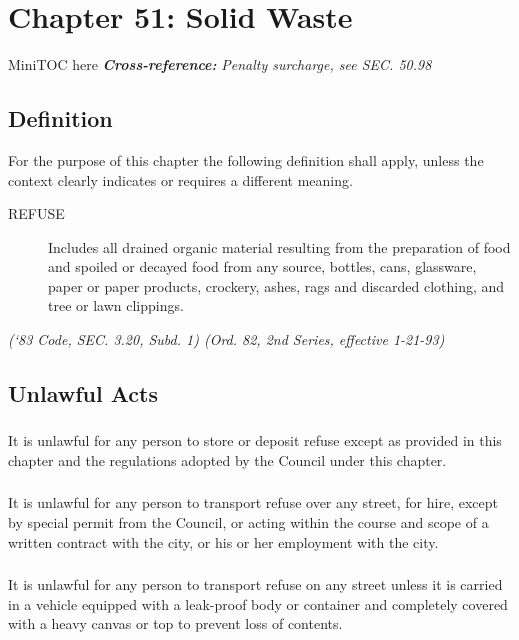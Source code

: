 \documentclass[code.tex]{subfiles}
\begin{document}
\chapter*{Chapter 51: \newline
	Solid Waste}

MiniTOC here\newline
\textbf{\emph{{Cross-reference:}}}\newline
\emph{Penalty surcharge, see SEC. 50.98}
\pagebreak

\section{Definition}
For the purpose of this chapter the following definition shall apply, unless the context clearly indicates or requires a different meaning.
\begin{description}
\item[REFUSE] Includes all drained organic material resulting from the preparation of food and spoiled or decayed food from any source, bottles, cans, glassware, paper or paper products, crockery, ashes, rags and discarded clothing, and tree or lawn clippings.
\end{description}
\emph{(‘83 Code, SEC. 3.20, Subd. 1) (Ord. 82, 2nd Series, effective 1-21-93)}
\section{Unlawful Acts}
\subsection{}
It is unlawful for any person to store or deposit refuse except as provided in this chapter and the regulations adopted by the Council under this chapter.
\subsection{}
It is unlawful for any person to transport refuse over any street, for hire, except by special permit from the Council, or acting within the course and scope of a written contract with the city, or his or her employment with the city.
\subsection{}
It is unlawful for any person to transport refuse on any street unless it is carried in a vehicle equipped with a leak-proof body or container and completely covered with a heavy canvas or top to prevent loss of contents.
\end{document}
